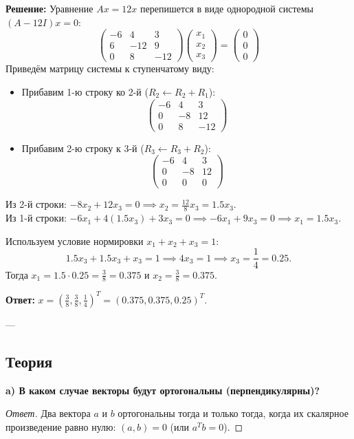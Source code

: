 \documentclass[11pt, a4paper]{article}
\begin{document}
\textbf{Решение:}
Уравнение $Ax = 12x$ перепишется в виде однородной системы $(A - 12I)x = 0$:
$$ \begin{pmatrix} -6 & 4 & 3 \\ 6 & -12 & 9 \\ 0 & 8 & -12 \end{pmatrix} \begin{pmatrix} x_1 \\ x_2 \\ x_3 \end{pmatrix} = \begin{pmatrix} 0 \\ 0 \\ 0 \end{pmatrix} $$
Приведём матрицу системы к ступенчатому виду:
\begin{itemize}
\item Прибавим 1-ю строку ко 2-й ($R_2 \leftarrow R_2 + R_1$):
$$ \begin{pmatrix} -6 & 4 & 3 \\ 0 & -8 & 12 \\ 0 & 8 & -12 \end{pmatrix} $$
\item Прибавим 2-ю строку к 3-й ($R_3 \leftarrow R_3 + R_2$):
$$ \begin{pmatrix} -6 & 4 & 3 \\ 0 & -8 & 12 \\ 0 & 0 & 0 \end{pmatrix} $$
\end{itemize}
Из 2-й строки: $-8x_2 + 12x_3 = 0 \implies x_2 = \frac{12}{8} x_3 = 1.5 x_3$. \\
Из 1-й строки: $-6x_1 + 4(1.5x_3) + 3x_3 = 0 \implies -6x_1 + 9x_3 = 0 \implies x_1 = 1.5 x_3$.

Используем условие нормировки $x_1 + x_2 + x_3 = 1$:
$$ 1.5x_3 + 1.5x_3 + x_3 = 1 \implies 4x_3 = 1 \implies x_3 = \frac{1}{4} = 0.25. $$
Тогда $x_1 = 1.5 \cdot 0.25 = \frac{3}{8} = 0.375$ и $x_2 = \frac{3}{8} = 0.375$.

\textbf{Ответ:} $x = \left(\frac{3}{8}, \frac{3}{8}, \frac{1}{4}\right)^T = (0.375, 0.375, 0.25)^T$.

---

\subsection*{Теория}

\textbf{a) В каком случае векторы будут ортогональны (перпендикулярны)?}
\begin{proof}[Ответ]
Два вектора $a$ и $b$ ортогональны тогда и только тогда, когда их скалярное произведение равно нулю: $(a, b) = 0$ (или $a^T b = 0$).
\end{proof}
\end{document}
